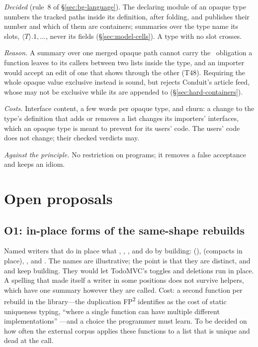 \emph{Decided} (rule~8 of \S\ref{sec:bg-language}). The declaring module of an opaque type numbers the
tracked paths inside its definition, after folding,
and publishes their number and which of them are containers; summaries over the type name its slots,
$\langle T\rangle.1, \ldots$, never its fields (\S\ref{sec:model-cells}). A type with no slot crosses.

\emph{Reason.} A summary over one merged opaque path cannot carry the \Disjoint\ obligation a function
leaves to its callers between two lists inside the type, and an importer would accept an edit of one that
shows through the other (T48). Requiring the whole opaque value exclusive instead is sound, but rejects
Conduit's article feed, whose  may not be exclusive while its  are appended to
(\S\ref{sec:hard-containers}).

\emph{Costs.} Interface content, a few words per opaque type, and churn: a change to the type's
definition that adds or removes a list changes its importers' interfaces, which an opaque type is meant to
prevent for its users' code. The users' code does not change; their checked verdicts may.

\emph{Against the principle.} No restriction on programs; it removes a false acceptance and keeps an
idiom.

\section{Open proposals}

\subsection*{O1: in-place forms of the same-shape rebuilds}

Named writers that do in place what , , ,  and  do
by building:  (),  (compacts in
place), ,  and . The names are
illustrative; the point is that they are distinct, and  and  keep building. They
would let TodoMVC's toggles and deletions run in place. A spelling that made  itself a writer in
some positions does not survive helpers, which have one summary however they are called. Cost: a second
function per rebuild in the library---the duplication FP\textsuperscript{2} identifies as the cost of
static uniqueness typing, ``where a single function can have multiple different implementations''
\citep[\S1.4.1]{lorenzen2023fp2}---and a choice the programmer must learn. To be decided on how often the
external corpus applies these functions to a list that is unique and dead at the call.

